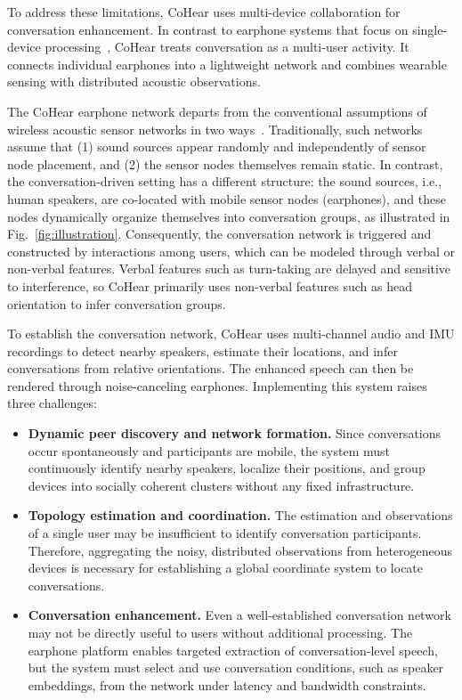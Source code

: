 To address these limitations, CoHear uses multi-device collaboration for conversation enhancement. In contrast to earphone systems that focus on single-device processing~\cite{dong2024rehearsse, he2023towards, duan2024earse}, CoHear treats conversation as a multi-user activity. It connects individual earphones into a lightweight network and combines wearable sensing with distributed acoustic observations.


The CoHear earphone network departs from the conventional assumptions of wireless acoustic sensor networks in two ways~\cite{gburrek2021geometry}. Traditionally, such networks assume that (1) sound sources appear randomly and independently of sensor node placement, and (2) the sensor nodes themselves remain static. In contrast, the conversation-driven setting has a different structure: the sound sources, i.e., human speakers, are co-located with mobile sensor nodes (earphones), and these nodes dynamically organize themselves into conversation groups, as illustrated in Fig.~\ref{fig:illustration}.
Consequently, the conversation network is triggered and constructed by interactions among users, which can be modeled through verbal or non-verbal features. Verbal features such as turn-taking are delayed and sensitive to interference, so CoHear primarily uses non-verbal features such as head orientation to infer conversation groups.

To establish the conversation network, CoHear uses multi-channel audio and IMU recordings to detect nearby speakers, estimate their locations, and infer conversations from relative orientations. The enhanced speech can then be rendered through noise-canceling earphones. Implementing this system raises three challenges:
\begin{itemize}
    \item \textbf{Dynamic peer discovery and network formation.} Since conversations occur spontaneously and participants are mobile, the system must continuously identify nearby speakers, localize their positions, and group devices into socially coherent clusters without any fixed infrastructure.

    \item \textbf{Topology estimation and coordination.}
    The estimation and observations of a single user may be insufficient to identify conversation participants. Therefore, aggregating the noisy, distributed observations from heterogeneous devices is necessary for establishing a global coordinate system to locate conversations.

    \item \textbf{Conversation enhancement.}
    Even a well-established conversation network may not be directly useful to users without additional processing. The earphone platform enables targeted extraction of conversation-level speech, but the system must select and use conversation conditions, such as speaker embeddings, from the network under latency and bandwidth constraints.
\end{itemize}




